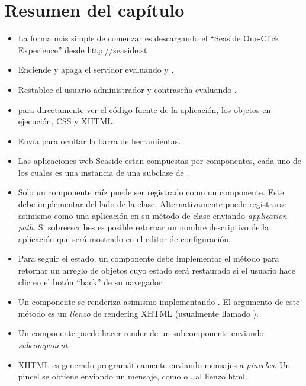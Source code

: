 \documentclass[a4paper,10pt,twoside]{book}
\begin{document}
\section{Resumen del cap\'itulo}

\begin{itemize}
  \item La forma m\'as simple de comenzar es descargando el ``Seaside One-Click Experience'' desde \url{http://seaside.st}
  \item Enciende y apaga el servidor evaluando  y .
  \item Restablce el usuario administrador y contrase\~na evaluando .
  \item {} para directamente ver el c\'odigo fuente de la aplicaci\'on, los objetos en ejecuci\'on, CSS y XHTML.
  \item Env\'ia  para ocultar la barra de herramientas.
  \item Las aplicaciones web Seaside estan compuestas por componentes, cada uno de los cuales es una instancia de una subclase de .
  \item Solo un componente ra\'iz puede ser registrado como un componente. Este debe implementar  del lado de la clase. Alternativamente puede registrarse asimismo como una aplicaci\'on en su m\'etodo de clase  enviando  \emph{application path}.
  Si sobreescribes  es posible retornar un nombre descriptivo de la aplicaci\'on que ser\'a mostrado en el editor de configuraci\'on.
  \item Para seguir el estado, un componente debe implementar el m\'etodo  para retornar un arreglo de objetos cuyo estado ser\'a restaurado si el usuario hace clic en el bot\'on ``back'' de su navegador.
  \item Un componente se renderiza asimismo implementando .
  El argumento de este m\'etodo es un \emph{lienzo} de rendering XHTML (usualmente llamado ).
  \item Un componente puede hacer render de un subcomponente enviando  \emph{subcomponent}.
  \item XHTML es generado program\'aticamente enviando mensajes a \emph{pinceles}. Un pincel se obtiene enviando un mensaje, como  o , al lienzo html.

\end{itemize}
\end{document}
